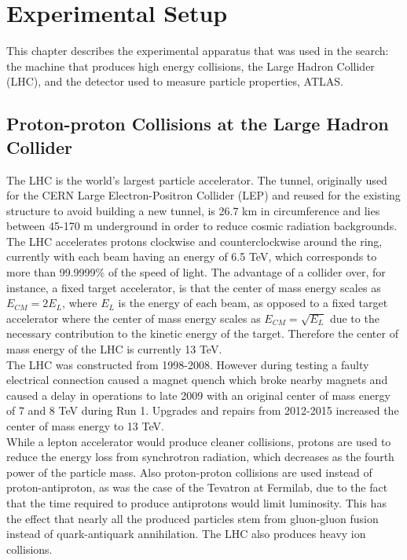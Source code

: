 \chapter{Experimental Setup}
\label{ch:experiment}

This chapter describes the experimental apparatus that was used in the search: the machine that produces high energy collisions, the Large Hadron Collider (LHC), and the detector used to measure particle properties, ATLAS.

\section{Proton-proton Collisions at the Large Hadron Collider}
The LHC is the world's largest particle accelerator.  The tunnel, originally used for the CERN Large Electron-Positron Collider (LEP) and reused for the existing structure to avoid building a new tunnel, is 26.7 km in circumference and lies between 45-170 m underground in order to reduce cosmic radiation backgrounds.  The LHC accelerates protons clockwise and counterclockwise around the ring, currently with each beam having an energy of 6.5 TeV, which corresponds to more than 99.9999\% of the speed of light.  The advantage of a collider over, for instance, a fixed target accelerator, is that the center of mass energy scales as $E_{CM} = 2E_{L}$, where $E_{L}$ is the energy of each beam, as opposed to a fixed target accelerator where the center of mass energy scales as $E_{CM}=\sqrt{E_{L}}$ due to the necessary contribution to the kinetic energy of the target.  Therefore the center of mass energy of the LHC is currently 13 TeV.\\

The LHC was constructed from 1998-2008.  However during testing a faulty electrical connection caused a magnet quench which broke nearby magnets and caused a delay in operations to late 2009 with an original center of mass energy of 7 and 8 TeV during Run 1.  Upgrades and repairs from 2012-2015 increased the center of mass energy to 13 TeV.  \\

While a lepton accelerator would produce cleaner collisions, protons are used to reduce the energy loss from synchrotron radiation, which decreases as the fourth power of the particle mass.  Also proton-proton collisions are used instead of proton-antiproton, as was the case of the Tevatron at Fermilab, due to the fact that the time required to produce antiprotons would limit luminosity.  This has the effect that nearly all the produced particles stem from gluon-gluon fusion instead of quark-antiquark annihilation.  The LHC also produces heavy ion collisions.\\

